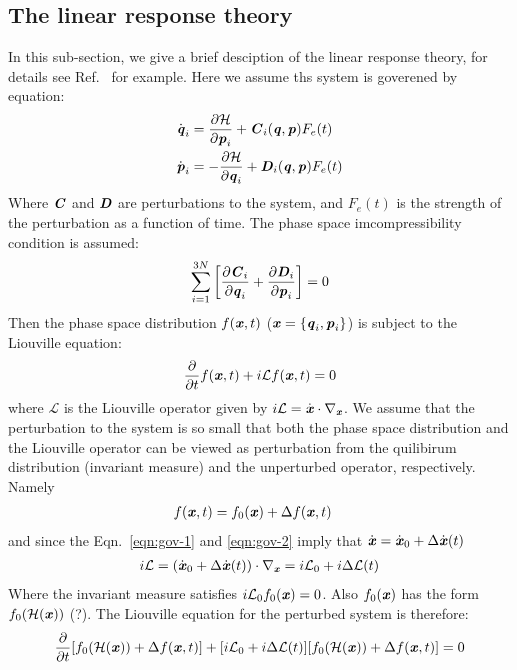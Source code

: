 \documentclass[aip,jcp,a4paper,reprint,onecolumn]{revtex4-1}
\newcommand{\vect}[1]{\textbf{\textit{#1}}}
\newcommand{\mh}{\mathcal H}
\newcommand{\ml}{\mathcal L}
\begin{document}
\subsection{The linear response theory}
In this sub-section, we give a brief desciption of the linear response
theory, for details see Ref.~\cite{tuckeman2010statistical} for
example. Here we assume ths system is goverened by equation:
\begin{align}\label{eqn:gov-1}
  \dot{\vect q}_i & = \frac{\partial\mh}{\partial \vect p_i}
  + \vect C_i(\vect q,\vect p) F_e(t)\\\label{eqn:gov-2}
  \dot{\vect p}_i & =- \frac{\partial\mh}{\partial \vect q_i}
  + \vect D_i(\vect q,\vect p) F_e(t)
\end{align}
Where $\vect C$ and $\vect D$ are perturbations to the system, and
$F_e(t)$ is the strength of the perturbation as a function of time.
The phase space imcompressibility condition is assumed:
\begin{align}
  \sum_{i=1}^{3N}
  \bigg[
  \frac{\partial \vect C_i}{\partial \vect q_i} +
  \frac{\partial \vect D_i}{\partial \vect p_i}
  \bigg] = 0
\end{align}
Then the phase space distribution $f(\vect x, t)$ ($\vect x = \{\vect
q_i, \vect p_i\}$) is subject to the Liouville equation:
\begin{align}
  \frac{\partial}{\partial t} f(\vect x, t) + i\ml f(\vect x, t) = 0
\end{align}
where $\ml$ is the Liouville operator given by $i\ml = \dot{\vect
  x}\cdot\nabla_{\vect x}$.  We assume that the perturbation to the
system is so small that both the phase space distribution and the
Liouville operator can be viewed as perturbation from the quilibirum
distribution (invariant measure) and the unperturbed operator,
respectively. Namely
\begin{align}
  f(\vect x, t) &= f_0(\vect x) + \Delta  f(\vect x, t)
\end{align}
and since the Eqn.~\eqref{eqn:gov-1} and \eqref{eqn:gov-2} imply that
$\dot{\vect x} = \dot{\vect x}_0 + \Delta \dot{\vect x}(t)$
\begin{align}
  i\ml =
  (\dot{\vect x}_0 + \Delta \dot{\vect x}(t))\cdot\nabla_{\vect x}
  = i\ml_0 + i\Delta\ml(t)
\end{align}
Where the invariant measure satisfies $i\ml_0f_0(\vect x) = 0$. Also
$f_0(\vect x)$ has the form $f_0(\mh(\vect x))$ (?). The Liouville equation
for the perturbed system is therefore:
\begin{align}
  \frac{\partial}{\partial t}
  [f_0(\mh(\vect x)) + \Delta  f(\vect x, t)]
  +
  [i\ml_0 + i\Delta\ml(t)]
  [f_0(\mh(\vect x)) + \Delta  f(\vect x, t)] = 0
\end{align}
\end{document}
